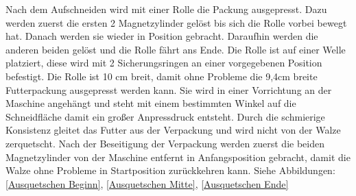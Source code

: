 Nach dem Aufschneiden wird mit einer Rolle die Packung ausgepresst. Dazu werden zuerst die ersten 2 Magnetzylinder gelöst bis sich die Rolle vorbei bewegt hat. Danach werden sie wieder in Position gebracht. Daraufhin werden die anderen beiden gelöst und die Rolle fährt ans Ende. Die Rolle ist auf einer Welle platziert, diese wird mit 2 Sicherungsringen an einer  vorgegebenen Position befestigt. Die Rolle ist 10 cm breit, damit ohne Probleme die 9,4cm breite Futterpackung ausgepresst werden kann. Sie wird in einer Vorrichtung an der Maschine angehängt und steht mit einem bestimmten Winkel auf die Schneidfläche damit ein großer Anpressdruck entsteht. Durch die schmierige Konsistenz gleitet das Futter aus der Verpackung und wird nicht von der Walze zerquetscht. Nach der Beseitigung der Verpackung werden zuerst die beiden Magnetzylinder von der Maschine entfernt in Anfangsposition gebracht, damit die Walze ohne Probleme in Startposition zurückkehren kann. Siehe Abbildungen: \ref{Ausquetschen Beginn}, \ref{Ausquetschen Mitte}, \ref{Ausquetschen Ende}



